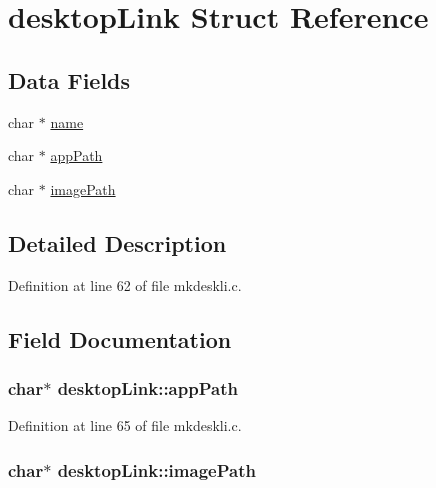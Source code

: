 \hypertarget{structdesktopLink}{\section{desktop\-Link Struct Reference}
\label{structdesktopLink}
}
\subsection*{Data Fields}
\begin{DoxyCompactItemize}
\item 
char $\ast$ \hyperlink{structdesktopLink_a2c2c14251c17686085db6497406d2e14}{name}
\item 
char $\ast$ \hyperlink{structdesktopLink_af53be27902760e193491d560c9c5b230}{app\-Path}
\item 
char $\ast$ \hyperlink{structdesktopLink_a2107a76d8ac46c78ac084a9bdda3ea23}{image\-Path}
\end{DoxyCompactItemize}


\subsection{Detailed Description}


Definition at line 62 of file mkdeskli.\-c.



\subsection{Field Documentation}
\hypertarget{structdesktopLink_af53be27902760e193491d560c9c5b230}{
\subsubsection[{app\-Path}]{\setlength{\rightskip}{0pt plus 5cm}char$\ast$ desktop\-Link\-::app\-Path}}\label{structdesktopLink_af53be27902760e193491d560c9c5b230}


Definition at line 65 of file mkdeskli.\-c.

\hypertarget{structdesktopLink_a2107a76d8ac46c78ac084a9bdda3ea23}{
\subsubsection[{image\-Path}]{\setlength{\rightskip}{0pt plus 5cm}char$\ast$ desktop\-Link\-::image\-Path}}\label{structdesktopLink_a2107a76d8ac46c78ac084a9bdda3ea23}


